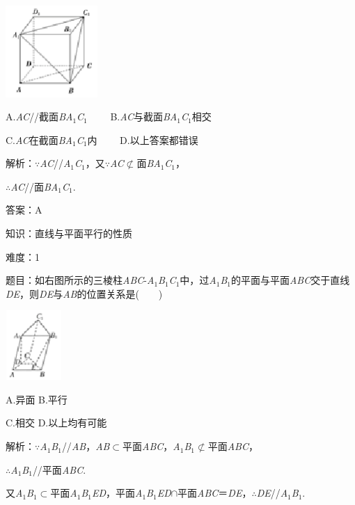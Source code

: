 \documentclass{article} %
\begin{document}
\includegraphics*[width=1.38in, height=1.37in, keepaspectratio=false]{image159}

A.\textit{AC}//截面\textit{BA}${}_{1}$\textit{C}${}_{1}$　　 B.\textit{AC}与截面\textit{BA}${}_{1}$\textit{C}${}_{1}$相交

C.\textit{AC}在截面\textit{BA}${}_{1}$\textit{C}${}_{1}$内　　 D.以上答案都错误

解析：$\mathrm{\because}$\textit{AC}//\textit{A}${}_{1}$\textit{C}${}_{1}$，又$\mathrm{\because}$\textit{AC}$\mathrm{\nsubset}$面\textit{BA}${}_{1}$\textit{C}${}_{1}$，

$\mathrm{\therefore}$\textit{AC}//面\textit{BA}${}_{1}$\textit{C}${}_{1}$.

答案：A

知识：直线与平面平行的性质

难度：1

题目：如右图所示的三棱柱\textit{ABC}-\textit{A}${}_{1}$\textit{B}${}_{1}$\textit{C}${}_{1}$中，过\textit{A}${}_{1}$\textit{B}${}_{1}$的平面与平面\textit{ABC}交于直线\textit{DE}，则\textit{DE}与\textit{AB}的位置关系是(　　)

\includegraphics*[width=0.84in, height=1.04in, keepaspectratio=false]{image160}

A.异面  B.平行

C.相交  D.以上均有可能

解析：$\mathrm{\because}$\textit{A}${}_{1}$\textit{B}${}_{1}$//\textit{AB}，\textit{AB}$\mathrm{\subset }$平面\textit{ABC}，\textit{A}${}_{1}$\textit{B}${}_{1}$$\mathrm{\nsubset}$平面\textit{ABC}，

$\mathrm{\therefore}$\textit{A}${}_{1}$\textit{B}${}_{1}$//平面\textit{ABC}.

又\textit{A}${}_{1}$\textit{B}${}_{1}$$\mathrm{\subset }$平面\textit{A}${}_{1}$\textit{B}${}_{1}$\textit{ED}，平面\textit{A}${}_{1}$\textit{B}${}_{1}$\textit{ED}$\mathrm{\cap}$平面\textit{ABC}＝\textit{DE}，$\mathrm{\therefore}$\textit{DE}//\textit{A}${}_{1}$\textit{B}${}_{1}$.
\end{document}
